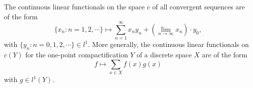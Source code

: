 The continuous linear functionals on the space $c$ of all convergent sequences are of the form
$$\{x_n : n = 1, 2, \cdots\} \mapsto \sum_{n=1}^\infty x_n y_n + \left( \lim_{n \to \infty} x_n \right) \cdot y_0,$$
with $\{y_n : n = 0, 1, 2, \cdots\} \in l^1$. More generally, the continuous linear functionals on $c(Y)$ for the one-point compactification $Y$ of a discrete space $X$ are of the form
$$f \mapsto \sum_{x \in X} f(x) g(x)$$
with $g \in l^1(Y)$.

